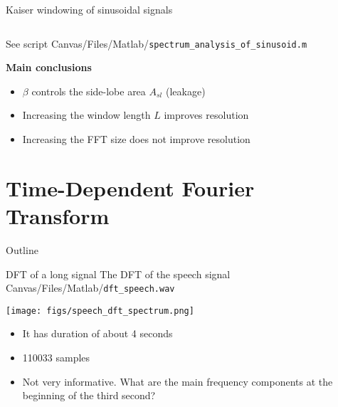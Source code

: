 \documentclass[10pt, aspectratio=169, handout]{beamer}
\begin{document}
%
\begin{frame}{Kaiser windowing of sinusoidal signals}

\begin{columns}
	\begin{column}{0.5\textwidth}
		\begin{center}
			\def\BETA{1}
			\resizebox{0.8\textwidth}{!}{}
		\end{center}
	\end{column}
	\begin{column}{0.5\textwidth}
		\begin{center}
			\resizebox{0.8\textwidth}{!}{}
		\end{center}
	\end{column}
\end{columns}

See script Canvas/Files/Matlab/\texttt{spectrum\_analysis\_of\_sinusoid.m}

\textbf{Main conclusions}
\begin{itemize}
	\item $\beta$ controls the side-lobe area $A_{sl}$ (leakage)
	\item Increasing the window length $L$ improves resolution
	\item Increasing the FFT size does not improve resolution
\end{itemize}

\end{frame}

%
\section{Time-Dependent Fourier Transform}
\begin{frame}{Outline}
\tableofcontents[currentsection]
\end{frame}

%
\begin{frame}{DFT of a long signal}
	The DFT of the speech signal Canvas/Files/Matlab/\texttt{dft\_speech.wav}
	
	\begin{center}
		\texttt{[image: figs/speech\_dft\_spectrum.png]}
	\end{center}
	
	\begin{itemize}
		\item It has duration of about 4 seconds
		\item 110033 samples
		\item Not very informative. What are the main frequency components at the beginning of the third second?
	\end{itemize}
\end{frame}
\end{document}
